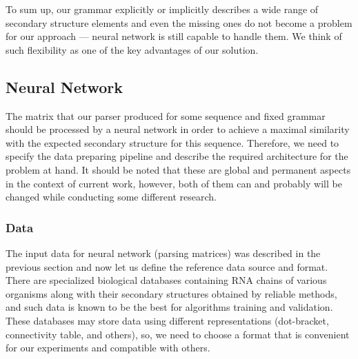 To sum up, our grammar explicitly or implicitly describes a wide range of secondary structure elements and even the missing ones do not become a problem for our approach --- neural network is still capable to handle them. We think of such flexibility as one of the key advantages of our solution.

\subsection{Neural Network}
The matrix that our parser produced for some sequence and fixed grammar should be processed by a neural network in order to achieve a maximal similarity with the expected secondary structure for this sequence. Therefore, we need to specify the data preparing pipeline and describe the required architecture for the problem at hand. It should be noted that these are global and permanent aspects in the context of current work, however, both of them can and probably will be changed while conducting some different research.

\subsubsection{Data}
The input data for neural network (parsing matrices) was described in the previous section and now let us define the reference data source and format. There are specialized biological databases containing RNA chains of various organisms along with their secondary structures obtained by reliable methods, and such data is known to be the best for algorithms training and validation. These databases may store data using different representations (dot-bracket, connectivity table, and others), so, we need to choose a format that is convenient for our experiments and compatible with others.

